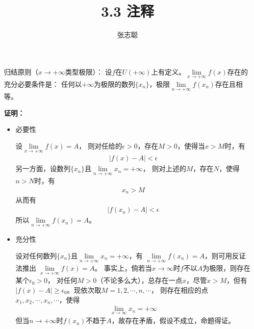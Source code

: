 \documentclass{article}
\begin{document}
\title{3.3 注释}
\author{张志聪}
\maketitle

\begin{zremark}
  归结原则（$x \to +\infty$类型极限）：
  设$f$在$U(+\infty)$上有定义。$\lim\limits_{x \to +\infty} f(x)$存在的充分必要条件是：
  任何以$+\infty$为极限的数列$\{x_n\}$，极限$\lim\limits_{n \to +\infty} f(x_n)$存在且相等。
\end{zremark}

\textbf{证明：}

\begin{itemize}
  \item 必要性

        设$\lim\limits_{x \to +\infty} f(x) = A$，
        则对任给的$\epsilon > 0$，存在$M > 0$，使得当$x > M$时，有
        \begin{align*}
          |f(x) - A| < \epsilon
        \end{align*}
        另一方面，设数列$\{x_n\}$且$\lim\limits_{n \to +\infty} x_n = +\infty$，
        则对上述的$M$，存在$N$，使得$n > N$时，有
        \begin{align*}
          x_n > M
        \end{align*}
        从而有
        \begin{align*}
          |f(x_n) - A| < \epsilon
        \end{align*}
        所以$\lim\limits_{n \to +\infty} f(x_n) = A$。

  \item 充分性

        设对任何数列$\{x_n\}$且$\lim\limits_{n \to +\infty} x_n = +\infty$，有
        $\lim\limits_{n \to +\infty} f(x_n) = A$，则可用反证法推出
        $\lim\limits_{x \to +\infty} f(x) = A$。
        事实上，倘若当$x \to \infty$时$f$不以$A$为极限，则存在某个$\epsilon_0 > 0$，
        对任何$M > 0$（不论多么大），总存在一点$x$，尽管$x > M$，但有
        $|f(x) - A| \geq \epsilon_0$。现依次取$M = 1, 2, \cdots, n, \cdots$，
        则存在相应的点$x_1, x_2, \cdots, x_n, \cdots$，使得
        \begin{align*}
          \lim\limits_{x \to \infty} x_n = +\infty
        \end{align*}
        但当$n \to +\infty$时$f(x_n)$不趋于$A$，故存在矛盾，假设不成立，命题得证。
\end{itemize}
\end{document}
